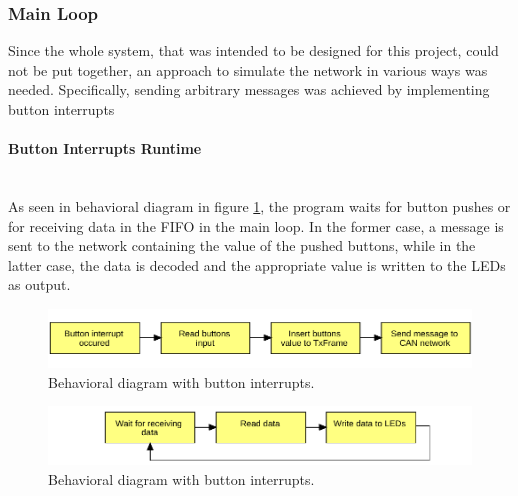 \subsubsection{Main Loop}
Since the whole system, that was intended to be designed for this project, could not be put together, an approach to simulate the network in various ways was needed.
Specifically, sending arbitrary messages was achieved by implementing button interrupts

\paragraph{Button Interrupts Runtime}~\\
As seen in behavioral diagram in figure \ref{fig:FlowChart_CANSoft_BtnsIntr}, the program waits for button pushes or for receiving data in the FIFO in the main loop.
In the former case, a message is sent to the network containing the value of the pushed buttons, while in the latter case, the data is decoded and the appropriate value is written to the LEDs as output.
\begin{figure}[h!]
	\centering
	\includegraphics[width = 1\linewidth]{graphics/FlowChart_CANSoft_BtnsIntr.pdf}
	\caption{Behavioral diagram with button interrupts.}
	\label{fig:FlowChart_CANSoft_BtnsIntr}
\end{figure}
\begin{figure}[h!]
	\centering
	\includegraphics[width = 1\linewidth]{graphics/FlowChart_CANSoft_RecvData.pdf}
	\caption{Behavioral diagram with button interrupts.}
	\label{fig:FlowChart_CANSoft_RecvData}
\end{figure}

